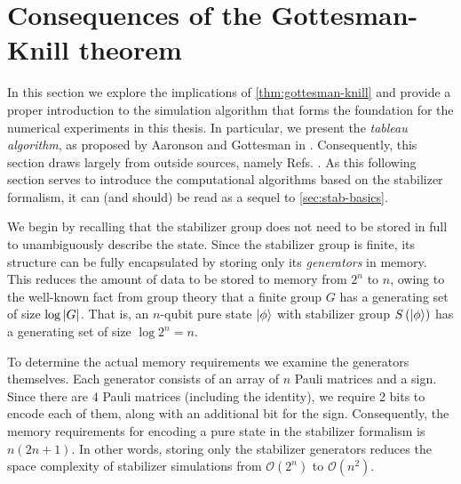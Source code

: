 \section{Consequences of the Gottesman-Knill theorem}\label{sec:sim-stab}
In this section we explore the implications of \cref{thm:gottesman-knill} and
provide a proper introduction to the simulation algorithm that forms the
foundation for the numerical experiments in this thesis.  In particular, we
present the \emph{tableau algorithm}, as proposed by Aaronson and Gottesman in
\cite{aaronsonImprovedSimulationStabilizer2004}.  Consequently, this section
draws largely from outside sources, namely Refs.
\cite{aaronsonImprovedSimulationStabilizer2004, arabLectureNotesQuantum2024,
gottesmanStabilizerCodesQuantum1997,
gottesmanHeisenbergRepresentationQuantum1998}. As this following section serves
to introduce the computational algorithms based on the stabilizer formalism, it
can (and should) be read as a sequel to \cref{sec:stab-basics}.

We begin by recalling that the stabilizer group does not need to be stored in
full to unambiguously describe the state. Since the stabilizer group is finite,
its structure can be fully encapsulated by storing only its \emph{generators}
in memory. This reduces the amount of data to be stored to memory from $2^n$
to $n$, owing to the well-known fact from group theory that a finite group $G$
has a generating set of size $\log \abs{G}$. That is, an $n$-qubit pure state
$\ket{\phi}$ with stabilizer group $S\left(\ket{\phi}\right)$ has a generating
set of size $\log 2^n = n$.

To determine the actual memory requirements we examine the generators
themselves.  Each generator consists of an array of $n$ Pauli matrices and a
sign. Since there are $4$ Pauli matrices (including the identity), we require 2
bits to encode each of them, along with an additional bit for the sign.
Consequently, the memory requirements for encoding a pure state in the
stabilizer formalism is $n(2n+1)$. In other words, storing only the stabilizer
generators reduces the space complexity of stabilizer simulations from
$\mathcal{O}\left( 2^n \right)$ to $\mathcal{O}\left( n^2 \right)$.

